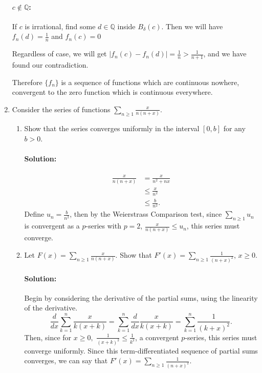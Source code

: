 \documentclass{article}
\begin{document}
\begin{enumerate}
\paragraph{$c\not\in \mathbb{Q}$:} If $c$ is irrational, find some $d\in\mathbb{Q}$ inside $B_{\delta}(c)$. Then we will have $f_n(d)=\frac{1}{n}$ and $f_n(c)=0$

Regardless of case, we will get $|f_n(c)-f_n(d)|=\frac{1}{n}>\frac{1}{n+1}$, and we have found our contradiction.

  Therefore $\{f_n\} $ is a sequence of functions which are continuous nowhere, convergent to the zero function which is continuous everywhere. 

  \newpage
\item Consider the series of functions $\sum_{n\geq 1}^{} \frac{x}{n(n+x)}$.
  \begin{enumerate}
    \item Show that the series converges uniformly in the interval $[0,b]$ for any $b>0$.

        \paragraph{Solution:} 
        \begin{align*}
            \frac{x}{n(n+x)}&= \frac{x}{n^2+nx} \\
                            &\leq \frac{x}{n^2}\\
                            &\leq \frac{b}{n^2}
        .\end{align*}
        Define $u_n=\frac{b}{n^2}$, then by the Weierstrass Comparison test, since $\sum_{n\geq 1}^{} u_n$ is convergent as a $p$-series with $p=2$, $\frac{x}{n(n+x)}\leq u_n$, this series must converge.

    \item Let $F(x)=\sum_{n\geq 1}^{} \frac{x}{n(n+x)}$. Show that $F'(x)=\sum_{n\geq 1}^{} \frac{1}{(n+x)^2}$, $x\geq 0$.
        \paragraph{Solution: }Begin by considering the derivative of the partial sums, using the linearity of the derivative.
        \[
        \frac{d}{dx}\sum_{k=1}^{n} \frac{x}{k(x+k)}=\sum_{k=1}^{n} \frac{d}{dx} \frac{x}{k(x+k)}=\sum_{k=1}^{n} \frac{1}{(k+x)^2}
        .\] 
        Then, since for $x\geq 0,$ $ \frac{1}{(x+k)^2}\leq \frac{1}{k^2}$, a convergent $p$-series, this series must converge uniformly. Since this term-differentiated sequence of partial sums converges, we can say that $F'(x)=\sum_{n\geq 1}^{} \frac{1}{(n+x)^2}$.
        

\end{enumerate}
\end{enumerate}
\end{document}
